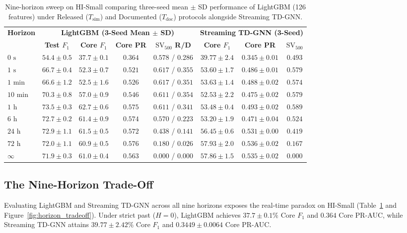 \documentclass[sigconf,nonacm]{acmart}
\begin{document}
\begin{table}[t]
\centering
\caption{Nine-horizon sweep on HI-Small comparing three-seed mean $\pm$ SD performance of LightGBM (126 features) under Released ($T_{\text{sim}}$) and Documented ($T_{\text{doc}}$) protocols alongside Streaming TD-GNN.}
\label{tab:horizon_sweep}
\scriptsize
\setlength{\tabcolsep}{3.5pt}
\begin{tabular}{lccccccc}
\toprule
\textbf{Horizon} & \multicolumn{4}{c}{\textbf{LightGBM (3-Seed Mean $\pm$ SD)}} & \multicolumn{3}{c}{\textbf{Streaming TD-GNN (3-Seed)}} \\
\cmidrule(lr){2-5} \cmidrule(lr){6-8}
 & \textbf{Test $F_1$} & \textbf{Core $F_1$} & \textbf{Core PR} & \textbf{$\text{SV}_{500}$ R/D} & \textbf{Core $F_1$} & \textbf{Core PR} & \textbf{$\text{SV}_{500}$} \\
\midrule
$0\text{ s}$ & $54.4 \pm 0.5$ & $37.7 \pm 0.1$ & $0.364$ & $0.578$ / $0.286$ & $39.77 \pm 2.4$ & $0.345 \pm 0.01$ & $0.493$ \\
$1\text{ s}$ & $66.7 \pm 0.4$ & $52.3 \pm 0.7$ & $0.521$ & $0.617$ / $0.355$ & $53.60 \pm 1.7$ & $0.486 \pm 0.01$ & $0.579$ \\
$1\text{ min}$ & $66.6 \pm 1.2$ & $52.5 \pm 1.6$ & $0.526$ & $0.617$ / $0.351$ & $53.63 \pm 1.4$ & $0.488 \pm 0.02$ & $0.574$ \\
$10\text{ min}$ & $70.3 \pm 0.8$ & $57.0 \pm 0.9$ & $0.546$ & $0.611$ / $0.354$ & $52.53 \pm 2.2$ & $0.475 \pm 0.02$ & $0.579$ \\
$1\text{ h}$ & $73.5 \pm 0.3$ & $62.7 \pm 0.6$ & $0.575$ & $0.611$ / $0.341$ & $53.48 \pm 0.4$ & $0.493 \pm 0.02$ & $0.589$ \\
$6\text{ h}$ & $72.7 \pm 0.2$ & $61.4 \pm 0.9$ & $0.574$ & $0.570$ / $0.223$ & $53.20 \pm 1.9$ & $0.471 \pm 0.04$ & $0.524$ \\
$24\text{ h}$ & $72.9 \pm 1.1$ & $61.5 \pm 0.5$ & $0.572$ & $0.438$ / $0.141$ & $56.45 \pm 0.6$ & $0.531 \pm 0.00$ & $0.419$ \\
$72\text{ h}$ & $72.0 \pm 1.1$ & $60.9 \pm 0.5$ & $0.576$ & $0.180$ / $0.026$ & $57.93 \pm 2.0$ & $0.536 \pm 0.02$ & $0.167$ \\
$\infty$ & $71.9 \pm 0.3$ & $61.0 \pm 0.4$ & $0.563$ & $0.000$ / $0.000$ & $57.86 \pm 1.5$ & $0.535 \pm 0.02$ & $0.000$ \\
\bottomrule
\end{tabular}
\end{table}

\subsection{The Nine-Horizon Trade-Off}
Evaluating LightGBM and Streaming TD-GNN across all nine horizons exposes the real-time paradox on HI-Small (Table~\ref{tab:horizon_sweep} and Figure~\ref{fig:horizon_tradeoff}). Under strict past ($H=0$), LightGBM achieves $37.7 \pm 0.1\%$ Core $F_1$ and $0.364$ Core PR-AUC, while Streaming TD-GNN attains $39.77 \pm 2.42\%$ Core $F_1$ and $0.3449 \pm 0.0064$ Core PR-AUC.
\end{document}
